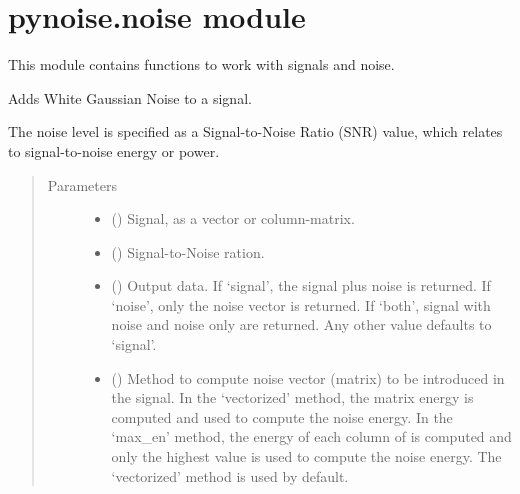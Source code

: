 \documentclass[letterpaper,10pt,english]{sphinxmanual}
\begin{document}
\section{pynoise.noise module}
\label{\detokenize{pynoise:module-pynoise.noise}}\label{\detokenize{pynoise:pynoise-noise-module}}
This module contains functions to work with signals and noise.

\label{\detokenize{pynoise:module-noise}}

\begin{fulllineitems}
\label{\detokenize{pynoise:pynoise.noise.awgn}}
Adds White Gaussian Noise to a signal.

The noise level is specified as a Signal-to-Noise Ratio (SNR) value,
which relates to signal-to-noise energy or power.
\begin{quote}\begin{description}
\item[{Parameters}] \leavevmode\begin{itemize}
\item {} 
 () \textendash{} Signal, as a vector or column-matrix.

\item {} 
 (\sphinxstyleliteralemphasis{\sphinxupquote{, }}) \textendash{} Signal-to-Noise ration.

\item {} 
 (\sphinxstyleliteralemphasis{\sphinxupquote{, }}) \textendash{} Output data. If ‘signal’, the signal  plus noise is
returned. If ‘noise’, only the noise vector is returned. If
‘both’, signal with noise and noise only are returned. Any
other value defaults to ‘signal’.

\item {} 
 (\sphinxstyleliteralemphasis{\sphinxupquote{, }}) \textendash{} Method to compute noise vector (matrix) to be introduced in the
signal. In the ‘vectorized’ method, the matrix energy is computed
and used to compute the noise energy. In the ‘max\_en’ method, the
energy of each column of  is computed and only the highest
value is used to compute the noise energy. The ‘vectorized’ method
is used by default.


\end{itemize}
\end{description}
\end{quote}
\end{fulllineitems}
\end{document}
